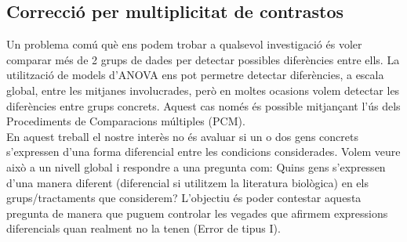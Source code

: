 \documentclass[english]{article}
\begin{document}
\subsection{Correcció per multiplicitat de contrastos}
Un problema comú què ens podem trobar a qualsevol investigació és voler comparar més de 2 grups de dades per detectar possibles diferències entre ells. La utilització de models d'ANOVA ens pot permetre detectar diferències, a escala global, entre les mitjanes involucrades, però en moltes ocasions volem detectar les diferències entre grups concrets. Aquest cas només és possible mitjançant l'ús dels Procediments de Comparacions múltiples (PCM).
\\

En aquest treball el nostre interès no és avaluar si un o dos gens concrets s'expressen d'una forma diferencial entre les condicions considerades. Volem veure això a un nivell global i respondre a una pregunta com: Quins gens s'expressen d'una manera diferent (diferencial si utilitzem la literatura biològica) en els grups/tractaments que considerem? L'objectiu és poder contestar aquesta pregunta de manera que puguem controlar les vegades que afirmem expressions diferencials quan realment no la tenen (Error de tipus I).
\\
\end{document}
